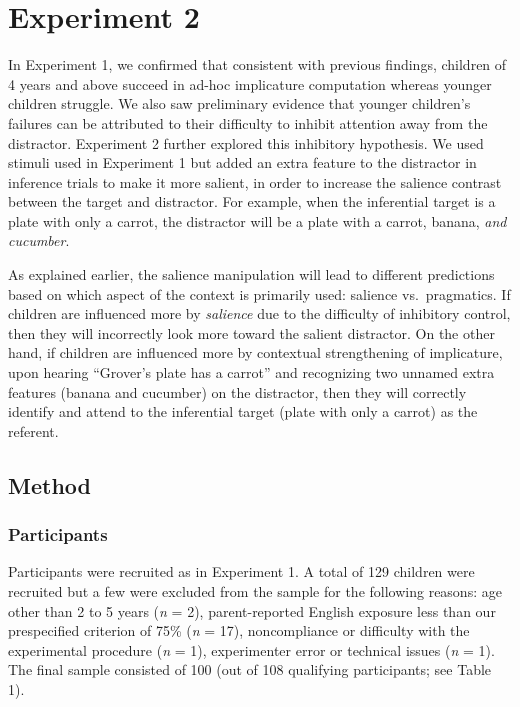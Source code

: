 \documentclass[a4paper,man,apacite,floatsintext]{apa6}
\begin{document}
\section{Experiment 2}\label{experiment-2}

In Experiment 1, we confirmed that consistent with previous findings,
children of 4 years and above succeed in ad-hoc implicature computation
whereas younger children struggle. We also saw preliminary evidence that
younger children's failures can be attributed to their difficulty to
inhibit attention away from the distractor. Experiment 2 further
explored this inhibitory hypothesis. We used stimuli used in Experiment
1 but added an extra feature to the distractor in inference trials to
make it more salient, in order to increase the salience contrast between
the target and distractor. For example, when the inferential target is a
plate with only a carrot, the distractor will be a plate with a carrot,
banana, \emph{and cucumber}.

As explained earlier, the salience manipulation will lead to different
predictions based on which aspect of the context is primarily used:
salience vs.~pragmatics. If children are influenced more by
\emph{salience} due to the difficulty of inhibitory control, then they
will incorrectly look more toward the salient distractor. On the other
hand, if children are influenced more by contextual strengthening of
implicature, upon hearing ``Grover's plate has a carrot'' and
recognizing two unnamed extra features (banana and cucumber) on the
distractor, then they will correctly identify and attend to the
inferential target (plate with only a carrot) as the referent.

\subsection{Method}\label{method-1}

\subsubsection{Participants}\label{participants-1}

Participants were recruited as in Experiment 1. A total of 129 children
were recruited but a few were excluded from the sample for the following
reasons: age other than 2 to 5 years (\emph{n} = 2), parent-reported
English exposure less than our prespecified criterion of 75\% (\emph{n}
= 17), noncompliance or difficulty with the experimental procedure
(\emph{n} = 1), experimenter error or technical issues (\emph{n} = 1).
The final sample consisted of 100 (out of 108 qualifying participants;
see Table 1).
\end{document}
